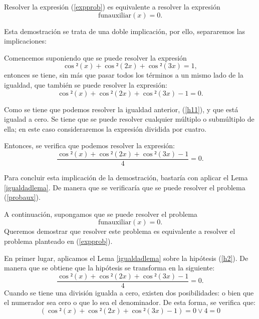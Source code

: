 \begin{lema}[Equivalencia]
  Resolver la expresión (\ref{expprob}) es equivalente a resolver
  la expresión
  \begin{equation}\label{probaux}
    \text{funauxiliar}(x)=0.
  \end{equation}
\end{lema}
\begin{demostracion}
  Esta demostración se trata de una doble implicación, por ello,
  separaremos las implicaciones:

  \noindent
  \framebox{\longrightarrow}
  Comencemos suponiendo que se puede resolver la expresión
  \begin{equation}\label{h1}\tag{h1}
    \cos²(x)+\cos²(2x)+\cos²(3x)=1,
  \end{equation}
  entonces se tiene, sin más que pasar todos los términos a un mismo
  lado de la igualdad, que también se puede resolver la expresión:
  \begin{equation}\label{h11}
    \cos²(x)+\cos²(2x)+\cos²(3x)-1=0.
  \end{equation}

  Como se tiene que podemos resolver la igualdad anterior,
  (\ref{h11}), y que está igualad a cero. Se tiene que se puede resolver
  cualquier múltiplo o submúltiplo de ella; en este caso consideraremos
  la expresión dividida por cuatro.

  Entonces, se verifica que podemos resolver la expresión:
  \begin{equation}\label{h12}
    \frac{\cos²(x)+\cos²(2x)+\cos²(3x)-1}{4}=0.
  \end{equation}

  Para concluir esta implicación de la demostración, bastaría con
  aplicar el Lema \ref{igualdadlema}. De manera que se verificaría
  que se puede resolver el problema (\ref{probaux}).

  \noindent
  \framebox{\longleftarrow} A continuación, supongamos que se puede
  resolver el problema
  \begin{equation}\label{h2}\tag{h2}
    \text{funauxiliar}(x)=0.
  \end{equation}
  Queremos demostrar que resolver este problema es equivalente a
  resolver el problema planteado en (\ref{expprob}).

  En primer lugar, aplicamos el Lema \ref{igualdadlema} sobre la
  hipótesis (\ref{h2}). De manera que se obtiene que la hipótesis
  se transforma en la siguiente:
  \begin{equation}
    \frac{\cos²(x)+\cos²(2x)+\cos²(3x)-1}{4}=0.
  \end{equation}
  Cuando se tiene una división igualda a cero, existen dos
  posibilidades: o bien que el numerador sea cero o que lo sea
  el denominador. De esta forma, se verifica que:
  \begin{equation}
    (\cos²(x)+\cos²(2x)+\cos²(3x)-1)=0 \lor 4=0
  \end{equation}
  
\end{demostracion}

